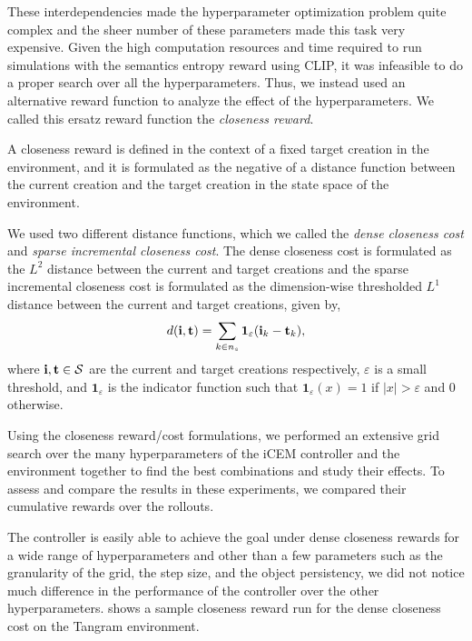 These interdependencies made the hyperparameter optimization problem quite complex and the sheer number of these parameters made this task very expensive.
Given the high computation resources and time required to run simulations with the semantics entropy reward using CLIP, it was infeasible to do a proper search over all the hyperparameters.
Thus, we instead used an alternative reward function to analyze the effect of the hyperparameters.
We called this ersatz reward function the \emph{closeness reward}.

A closeness reward is defined in the context of a fixed target creation in the environment, and it is formulated as the negative of a distance function between the current creation and the target creation in the state space of the environment.

We used two different distance functions, which we called the \emph{dense closeness cost} and \emph{sparse incremental closeness cost}.
The dense closeness cost is formulated as the \(L^2\) distance between the current and target creations and the sparse incremental closeness cost is formulated as the dimension-wise thresholded \(L^1\) distance between the current and target creations, given by,
\begin{equation}
    \label{eq:closeness-reward-sparse}
    d(\mathbf{i}, \mathbf{t}) = \sum_{k \in n_s} \bm{1}_\varepsilon(\mathbf{i}_k - \mathbf{t}_k),
\end{equation}
where \(\mathbf{i}, \mathbf{t} \in \mathcal{S}\) are the current and target creations respectively, \(\varepsilon\) is a small threshold, and \(\bm{1}_\varepsilon\) is the indicator function such that \(\bm{1}_\varepsilon(x) = 1\) if \(|x| > \varepsilon\) and \(0\) otherwise.

Using the closeness reward/cost formulations, we performed an extensive grid search over the many hyperparameters of the iCEM controller and the environment together to find the best combinations and study their effects.
To assess and compare the results in these experiments, we compared their cumulative rewards over the rollouts.

The controller is easily able to achieve the goal under dense closeness rewards for a wide range of hyperparameters and other than a few parameters such as the granularity of the grid, the step size, and the object persistency, we did not notice much difference in the performance of the controller over the other hyperparameters.
 shows a sample closeness reward run for the dense closeness cost on the Tangram environment.

